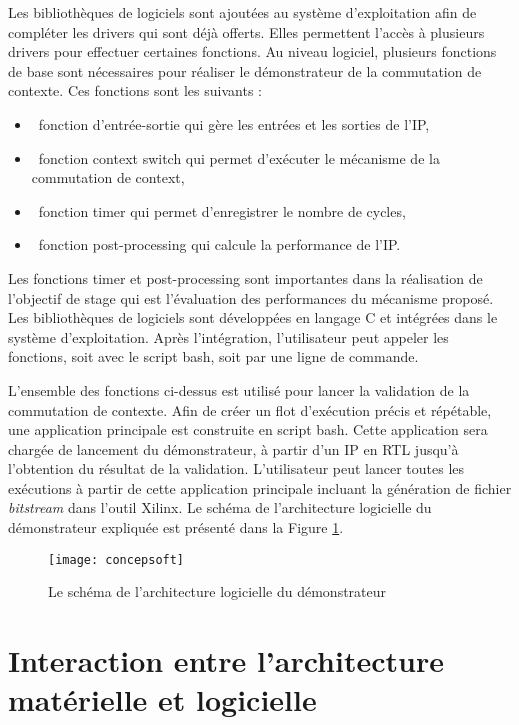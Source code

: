 Les bibliothèques de logiciels sont ajoutées au système d'exploitation afin de compléter les drivers qui sont déjà offerts. 
Elles permettent l'accès à plusieurs drivers pour effectuer certaines fonctions.
Au niveau logiciel, plusieurs fonctions de base sont nécessaires pour réaliser le démonstrateur de la commutation
de contexte. Ces fonctions sont les suivants :
\begin{itemize}
	\item\ fonction d'entrée-sortie qui gère les entrées et les sorties de l'IP, 
	\item\ fonction context switch qui permet d'exécuter le mécanisme de la commutation de context, 
	\item\ fonction timer qui permet d'enregistrer le nombre de cycles,
	\item\ fonction post-processing qui calcule la performance de l'IP.
\end{itemize}
Les fonctions timer et post-processing sont importantes dans la réalisation de l'objectif de stage qui est l'évaluation des performances
du mécanisme proposé. Les bibliothèques de logiciels sont développées en langage C et intégrées dans le système d'exploitation.
Après l'intégration, l'utilisateur peut appeler les fonctions, soit avec le script bash, soit par une ligne de commande.

L'ensemble des fonctions ci-dessus est utilisé pour lancer la validation de la commutation de contexte.
Afin de créer un flot d'exécution précis et répétable, une application principale est construite en script bash. 
Cette application sera chargée de lancement du démonstrateur, à partir d'un IP en RTL jusqu'à l'obtention du résultat de la validation.
L'utilisateur peut lancer toutes les exécutions à partir de cette application principale incluant la génération de fichier
\emph{bitstream} dans l'outil Xilinx.
Le schéma de l'architecture logicielle du démonstrateur expliquée est présenté dans la Figure \ref{fig:concepsoft}.

\begin{figure}[h]
	\centering
	\texttt{[image: concepsoft]}
	\caption{Le schéma de l'architecture logicielle du démonstrateur}
	\label{fig:concepsoft}
	\vspace{-2mm}
\end{figure}

\section{Interaction entre l'architecture matérielle et logicielle}

